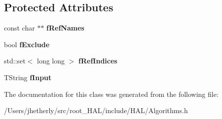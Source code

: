 \subsection*{Protected Attributes}
\begin{DoxyCompactItemize}
\item 
\hypertarget{class_h_a_l_1_1internal_1_1_filter_parent_algo_a9792f6500a21870e3b12812f505f97a8}{const char $\ast$$\ast$ {\bfseries f\-Ref\-Names}}\label{class_h_a_l_1_1internal_1_1_filter_parent_algo_a9792f6500a21870e3b12812f505f97a8}

\item 
\hypertarget{class_h_a_l_1_1internal_1_1_filter_parent_algo_a4e6b30b5b234548dc58af1fcc561f9e1}{bool {\bfseries f\-Exclude}}\label{class_h_a_l_1_1internal_1_1_filter_parent_algo_a4e6b30b5b234548dc58af1fcc561f9e1}

\item 
\hypertarget{class_h_a_l_1_1internal_1_1_filter_parent_algo_a9dc337dc3ad97ece63f7281bf7d26a8d}{std\-::set$<$ long long $>$ {\bfseries f\-Ref\-Indices}}\label{class_h_a_l_1_1internal_1_1_filter_parent_algo_a9dc337dc3ad97ece63f7281bf7d26a8d}

\item 
\hypertarget{class_h_a_l_1_1internal_1_1_filter_parent_algo_ae9c9036f9ffe9966f316b4ada1a2d62e}{T\-String {\bfseries f\-Input}}\label{class_h_a_l_1_1internal_1_1_filter_parent_algo_ae9c9036f9ffe9966f316b4ada1a2d62e}

\end{DoxyCompactItemize}


The documentation for this class was generated from the following file\-:\begin{DoxyCompactItemize}
\item 
/\-Users/jhetherly/src/root\-\_\-\-H\-A\-L/include/\-H\-A\-L/Algorithms.\-h\end{DoxyCompactItemize}

